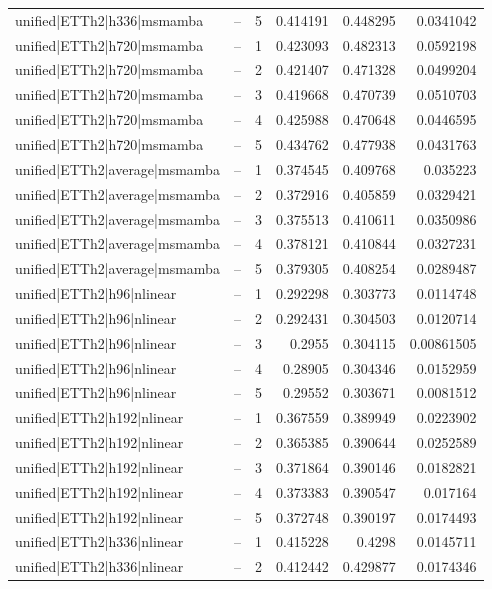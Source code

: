 \begin{longtable}{llrrrr}
unified|ETTh2|h336|msmamba & -- & 5 & 0.414191 & 0.448295 & 0.0341042 \\
unified|ETTh2|h720|msmamba & -- & 1 & 0.423093 & 0.482313 & 0.0592198 \\
unified|ETTh2|h720|msmamba & -- & 2 & 0.421407 & 0.471328 & 0.0499204 \\
unified|ETTh2|h720|msmamba & -- & 3 & 0.419668 & 0.470739 & 0.0510703 \\
unified|ETTh2|h720|msmamba & -- & 4 & 0.425988 & 0.470648 & 0.0446595 \\
unified|ETTh2|h720|msmamba & -- & 5 & 0.434762 & 0.477938 & 0.0431763 \\
unified|ETTh2|average|msmamba & -- & 1 & 0.374545 & 0.409768 & 0.035223 \\
unified|ETTh2|average|msmamba & -- & 2 & 0.372916 & 0.405859 & 0.0329421 \\
unified|ETTh2|average|msmamba & -- & 3 & 0.375513 & 0.410611 & 0.0350986 \\
unified|ETTh2|average|msmamba & -- & 4 & 0.378121 & 0.410844 & 0.0327231 \\
unified|ETTh2|average|msmamba & -- & 5 & 0.379305 & 0.408254 & 0.0289487 \\
unified|ETTh2|h96|nlinear & -- & 1 & 0.292298 & 0.303773 & 0.0114748 \\
unified|ETTh2|h96|nlinear & -- & 2 & 0.292431 & 0.304503 & 0.0120714 \\
unified|ETTh2|h96|nlinear & -- & 3 & 0.2955 & 0.304115 & 0.00861505 \\
unified|ETTh2|h96|nlinear & -- & 4 & 0.28905 & 0.304346 & 0.0152959 \\
unified|ETTh2|h96|nlinear & -- & 5 & 0.29552 & 0.303671 & 0.0081512 \\
unified|ETTh2|h192|nlinear & -- & 1 & 0.367559 & 0.389949 & 0.0223902 \\
unified|ETTh2|h192|nlinear & -- & 2 & 0.365385 & 0.390644 & 0.0252589 \\
unified|ETTh2|h192|nlinear & -- & 3 & 0.371864 & 0.390146 & 0.0182821 \\
unified|ETTh2|h192|nlinear & -- & 4 & 0.373383 & 0.390547 & 0.017164 \\
unified|ETTh2|h192|nlinear & -- & 5 & 0.372748 & 0.390197 & 0.0174493 \\
unified|ETTh2|h336|nlinear & -- & 1 & 0.415228 & 0.4298 & 0.0145711 \\
unified|ETTh2|h336|nlinear & -- & 2 & 0.412442 & 0.429877 & 0.0174346 \\

\end{longtable}
